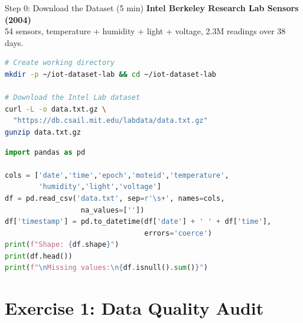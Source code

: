 \documentclass[aspectratio=169,11pt]{beamer}
\begin{document}
\begin{frame}[fragile]{Step 0: Download the Dataset (5 min)}
    \textbf{Intel Berkeley Research Lab Sensors (2004)}\\
    {\small 54 sensors, temperature + humidity + light + voltage, 2.3M readings over 38 days.}

    \vspace{0.2cm}
    \begin{lstlisting}[language=bash]
# Create working directory
mkdir -p ~/iot-dataset-lab && cd ~/iot-dataset-lab

# Download the Intel Lab dataset
curl -L -o data.txt.gz \
  "https://db.csail.mit.edu/labdata/data.txt.gz"
gunzip data.txt.gz
    \end{lstlisting}

    \vspace{0.1cm}
    \begin{lstlisting}[language=python]
import pandas as pd

cols = ['date','time','epoch','moteid','temperature',
        'humidity','light','voltage']
df = pd.read_csv('data.txt', sep=r'\s+', names=cols,
                  na_values=[''])
df['timestamp'] = pd.to_datetime(df['date'] + ' ' + df['time'],
                                 errors='coerce')
print(f"Shape: {df.shape}")
print(df.head())
print(f"\nMissing values:\n{df.isnull().sum()}")
    \end{lstlisting}

\end{frame}

\section{Exercise 1: Data Quality Audit}
\end{document}
